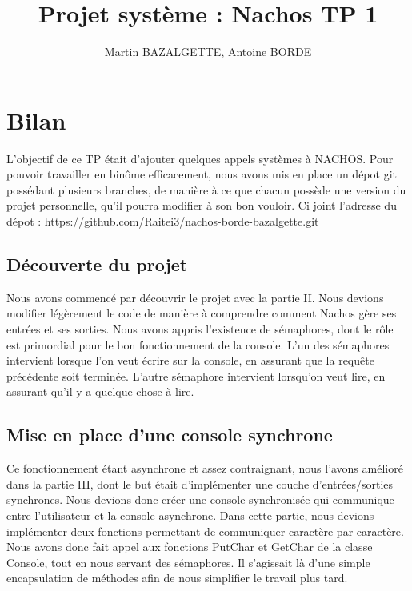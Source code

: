 \documentclass[12pt]{article}
\begin{document}
\title{Projet système : Nachos TP 1}
\author{Martin BAZALGETTE, Antoine BORDE}
\maketitle

\newpage
\tableofcontents
\newpage

\section{Bilan}
L'objectif de ce TP était d'ajouter quelques appels systèmes à NACHOS.
\newline
Pour pouvoir travailler en binôme efficacement, nous avons mis en place un dépot git possédant plusieurs branches, de manière à ce que chacun possède une version du projet personnelle, qu'il pourra modifier à son bon vouloir. Ci joint l'adresse du dépot : https://github.com/Raitei3/nachos-borde-bazalgette.git

\bigbreak
\subsection{Découverte du projet}
Nous avons commencé par découvrir le projet avec la partie II. Nous devions modifier légèrement le code de manière à comprendre comment Nachos gère ses entrées et ses sorties.
Nous avons appris l'existence de sémaphores, dont le rôle est primordial pour le bon fonctionnement de la console.
L'un des sémaphores intervient lorsque l'on veut écrire sur la console, en assurant que la requête précédente soit terminée. L'autre sémaphore intervient lorsqu'on veut lire, en assurant qu'il y a quelque chose à lire.

\bigbreak
\subsection{Mise en place d'une console synchrone}
Ce fonctionnement étant asynchrone et assez contraignant, nous l'avons amélioré dans la partie III, dont le but était d'implémenter une couche d'entrées/sorties synchrones. Nous devions donc créer une console synchronisée qui communique entre l'utilisateur et la console asynchrone.
Dans cette partie, nous devions implémenter deux fonctions permettant de communiquer caractère par caractère. Nous avons donc fait appel aux fonctions \textcolor{red2}{PutChar} et \textcolor{red2}{GetChar} de la classe Console, tout en nous servant des sémaphores.
Il s'agissait là d'une simple encapsulation de méthodes afin de nous simplifier le travail plus tard.
\end{document}
